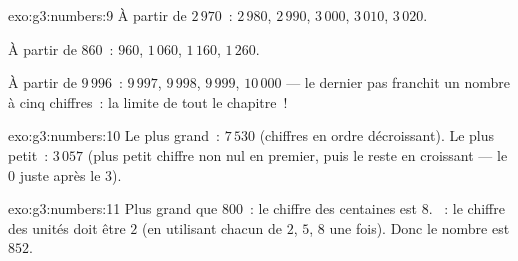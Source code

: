 \begin{solution}{exo:g3:numbers:9}
À partir de $2\,970$~: $2\,980$, $2\,990$, $3\,000$, $3\,010$,
$3\,020$.

À partir de $860$~: $960$, $1\,060$, $1\,160$, $1\,260$.

À partir de $9\,996$~: $9\,997$, $9\,998$, $9\,999$, $10\,000$ ---
le dernier pas franchit un nombre à cinq chiffres~: la limite de
tout le chapitre~!
\end{solution}

\begin{solution}{exo:g3:numbers:10}
Le plus grand~: $7\,530$ (chiffres en ordre décroissant). Le plus
petit~: $3\,057$ (plus petit chiffre non nul en premier, puis le
reste en croissant --- le $0$ juste après le $3$).
\end{solution}

\begin{solution}{exo:g3:numbers:11}
Plus grand que $800$~: le chiffre des centaines est $8$. ~: le
chiffre des unités doit être $2$ (en utilisant chacun de $2$,
$5$, $8$ une fois). Donc le nombre est $852$.
\end{solution}
